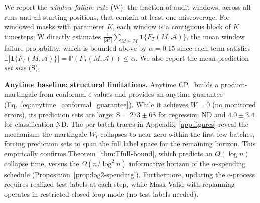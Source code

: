 \documentclass{uai2026} %
\newcommand{\1}{\mathbf{1}}
\newcommand{\ind}[1]{\mathbf{1}\{#1\}}
\newcommand{\prob}{\mathbb{P}}
\newcommand{\expec}{\mathbb{E}}
\newcommand{\mcal}{\mathcal{M}}
\newcommand{\acal}{\mathcal{A}}
\begin{document}
We report the \emph{window failure rate} (W): the fraction of audit windows, across all runs and all starting positions, that contain at least one miscoverage.
For windowed masks with parameter $K$, each window is a contiguous block of
$K$ timesteps; W directly estimates $\frac{1}{|\mcal|}\sum_{M \in \mcal}
\ind{F_T(M, \acal)}$, the mean window failure probability,
which is bounded above by $\alpha = 0.15$ since each term satisfies
$\expec\bigl[\ind{F_T(M,\acal)}\bigr] = \prob(F_T(M,\acal)) \le \alpha$.
We also report the mean prediction \emph{set size} (S),


\textbf{Anytime baseline: structural limitations.}
Anytime CP~\citep{gauthier2025values} builds a product-martingale from conformal e-values and provides an anytime guarantee (Eq.~\ref{eq:anytime_conformal_guarantee}).
While it achieves $W{=}0$ (no monitored errors), its prediction sets are large: $\mathrm{S}{=}273{\pm}68$ for regression ND and $4.0{\pm}3.4$ for classification ND.
The per-batch traces in Appendix~\ref{app:figures} reveal the mechanism: the martingale $W_t$ collapses to near zero within the first few batches, forcing prediction sets to span the full label space for the remaining horizon.
This empirically confirms Theorem~\ref{thm:Tfull-bound}, which predicts an $O(\log n)$ collapse time, versus the $\Omega(n/\log^2 n)$ informative horizon of the $\alpha$-spending schedule (Proposition~\ref{prop:log2-spending}).
Furthermore, updating the e-process requires realized test labels at each step, while Mask Valid with replanning operates in restricted closed-loop mode (no test labels needed).
\end{document}
